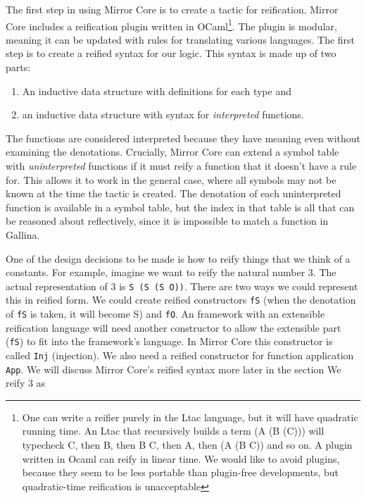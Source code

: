 \documentclass{puthesis}
\begin{document}
The first step in using Mirror Core is to create a tactic for
reification. Mirror Core includes a reification plugin written in
OCaml\footnote{One can write a reifier purely in the Ltac language,
  but it will have quadratic running time. An Ltac that recursively
  builds a term (A (B (C))) will typecheck C, then B, then B C, then
  A, then (A (B C)) and so on. A plugin written in Ocaml can reify in
  linear time.  We would like to avoid plugins, because they seem to
  be less portable than plugin-free developments, but quadratic-time
  reification is unacceptable}.  The plugin is modular, meaning it
can be updated with rules for translating various languages. The first
step is to create a reified syntax for our logic. This syntax is made
up of two parts:

\begin{enumerate}
\item An inductive data structure with definitions for each type and
\item an inductive data structure with syntax for \emph{interpreted}
  functions.
\end{enumerate}

The functions are considered interpreted because they have meaning
even without examining the denotations. Crucially, Mirror Core can
extend a symbol table with \emph{uninterpreted} functions if it must
reify a function that it doesn't have a rule for. This allows it to
work in the general case, where all symbols may not be known at the
time the tactic is created. The denotation of each uninterpreted
function is available in a symbol table, but the index in that table
is all that can be reasoned about reflectively, since it is impossible
to match a function in Gallina.

One of the design decisions to be made is how to reify things that we
think of a constants. For example, imagine we want to reify the
natural number $3$. The actual representation of $3$ is 
\lstinline|S (S (S O))|. There are two ways we could represent this in
reified form. We could create reified constructors \lstinline|fS|
(when the denotation of \lstinline|fS| is taken, it will become S) and
\lstinline|fO|. An framework with an extensible reification language
will need another constructor to allow the extensible part
(\lstinline|fS|) to fit into the framework's language. In Mirror Core
this constructor is called \lstinline|Inj| (injection). We also need a
reified constructor for function application \lstinline|App|. We will
discuss Mirror Core's reified syntax more later in the section
We reify $3$ as
\end{document}
